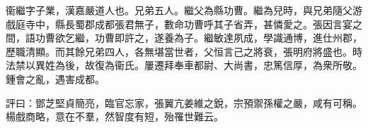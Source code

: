 \begin{pinyinscope}
衞繼字子業，漢嘉嚴道人也。兄弟五人。繼父為縣功曹。繼為兒時，與兄弟隨父游戲庭寺中，縣長蜀郡成都張君無子，數命功曹呼其子省弄，甚憐愛之。張因言宴之間，語功曹欲乞繼，功曹即許之，遂養為子。繼敏達夙成，學識通博，進仕州郡，歷職清顯。而其餘兄弟四人，各無堪當世者，父恒言己之將衰，張明府將盛也。時法禁以異姓為後，故復為衞氏。屢遷拜奉車都尉、大尚書，忠篤信厚，為衆所敬。鍾會之亂，遇害成都。

評曰：鄧芝堅貞簡亮，臨官忘家，張翼亢姜維之銳，宗預禦孫權之嚴，咸有可稱。楊戲商略，意在不羣，然智度有短，殆罹世難云。


\end{pinyinscope}